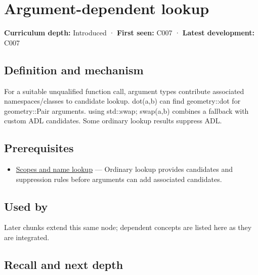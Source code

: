 \hypertarget{appendix-7863714aa97f}{}\label{referencestart:appendix-7863714aa97f}
\section{Argument-dependent lookup}\label{appendix-7863714aa97f-argument-dependent-lookup}

\textbf{Curriculum depth:} Introduced · \textbf{First seen:} C007 · \textbf{Latest development:} C007

\begin{allmightroledefinition}

\subsection{Definition and mechanism}\label{appendix-7863714aa97f-definition-and-mechanism}

For a suitable unqualified function call, argument types contribute associated namespaces/classes to candidate lookup. dot(a,b) can find geometry::dot for geometry::Pair arguments. using std::swap; swap(a,b) combines a fallback with custom ADL candidates. Some ordinary lookup results suppress ADL.

\end{allmightroledefinition}

\subsection{Prerequisites}\label{appendix-7863714aa97f-prerequisites}

\begin{itemize}
\tightlist
\item
  \hyperref[appendix-b12b31759da1]{Scopes and name lookup} --- Ordinary lookup provides candidates and suppression rules before arguments can add associated candidates.
\end{itemize}

\subsection{Used by}\label{appendix-7863714aa97f-used-by}

Later chunks extend this same node; dependent concepts are listed here as they are integrated.

\subsection{Recall and next depth}\label{appendix-7863714aa97f-recall-and-next-depth}

